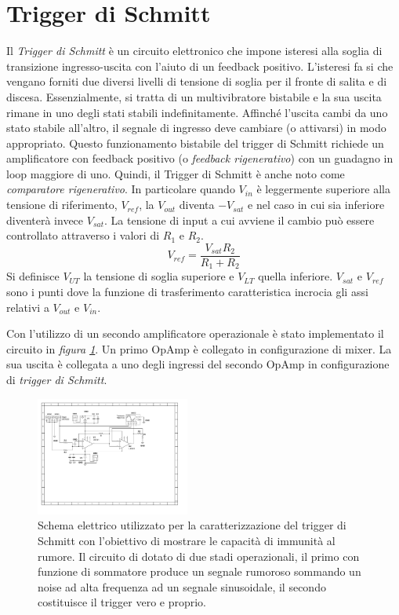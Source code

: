 \documentclass[journal]{IEEEtran}
\begin{document}
\section{Trigger di Schmitt} 

Il \textit{Trigger di Schmitt} è un circuito elettronico che impone isteresi alla soglia di transizione ingresso-uscita con l'aiuto di un feedback positivo. L'isteresi fa si che vengano forniti due diversi livelli di tensione di soglia per il fronte di salita e di discesa. Essenzialmente, si tratta di un multivibratore bistabile e la sua uscita rimane in uno degli stati stabili indefinitamente. Affinché l'uscita cambi da uno stato stabile all'altro, il segnale di ingresso deve cambiare (o attivarsi) in modo appropriato. Questo funzionamento bistabile del trigger di Schmitt richiede un amplificatore con feedback positivo (o \textit{feedback rigenerativo}) con un guadagno in loop maggiore di uno. Quindi, il Trigger di Schmitt è anche noto come \textit{comparatore rigenerativo}.
In particolare quando $V_{in}$ è leggermente superiore alla tensione di riferimento, $V_{ref}$, la $V_{out}$ diventa $-V_{sat}$ e nel caso in cui sia inferiore diventerà invece $V_{sat}$. La tensione di input a cui avviene il cambio può essere controllato attraverso i valori di $R_1$ e $R_2$.
\[V_{ref} = \frac{V_{sat}R_2}{R_1+R_2}\]
Si definisce $V_{UT}$ la tensione di soglia superiore e $V_{LT}$ quella inferiore. $V_{sat}$ e $V_{ref}$ sono i punti dove la funzione di trasferimento caratteristica incrocia gli assi relativi a $V_{out}$ e $V_{in}$.

Con l'utilizzo di un secondo amplificatore operazionale è stato implementato il circuito in \textit{figura \ref{fig:schmitt-trigger}}. Un primo OpAmp è collegato in configurazione di mixer. La sua uscita è collegata a uno degli ingressi del secondo OpAmp in configurazione di \textit{trigger di Schmitt}. 

\begin{figure}[H]%
\begin{center}
\includegraphics[width=0.45\textwidth]{sch-simulations/output/OPA-mixer-trigger.pdf}
\caption{Schema elettrico utilizzato per la caratterizzazione del trigger di Schmitt con l'obiettivo di mostrare le capacità di immunità al rumore. Il circuito di dotato di due stadi operazionali, il primo con funzione di sommatore produce un segnale rumoroso sommando un noise ad alta frequenza ad un segnale sinusoidale, il secondo costituisce il trigger vero e proprio.} %
\label{fig:schmitt-trigger}
\end{center}
\end{figure}
\end{document}
